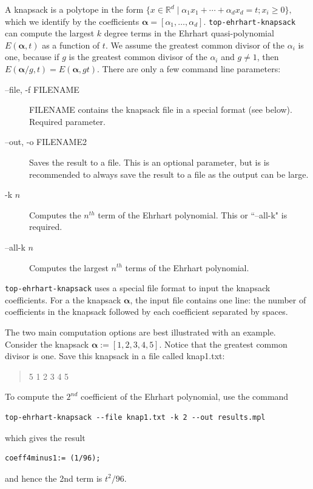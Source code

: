 \documentclass{article}
\newcommand{\R}{{\mathbb R}}
\begin{document}
A knapsack is a polytope in the form $\{x \in \R^d \mid \alpha_1 x_1 + \cdots + \alpha_d x_d = t; x_i \geq 0\},$ which we identify by the coefficients $\boldsymbol{\alpha}= [\alpha_1, \dots, \alpha_d].$   {\tt top-ehrhart-knapsack} can compute the largest $k$ degree terms in the Ehrhart quasi-polynomial $E(\boldsymbol{\alpha}, t)$ as a function of $t$.  We assume the greatest common divisor of the $\alpha_i$ is one, because if $g$ is the greatest common divisor of the $\alpha_i$ and $g\neq 1$, then $E(\boldsymbol{\alpha}/g, t) = E(\boldsymbol{\alpha}, gt) $. There are only a few command line parameters:

\begin{description}
\item[--file, -f FILENAME] FILENAME contains the knapsack file in a special format (see below). Required parameter.
\item[--out, -o FILENAME2] Saves the result to a file. This is an optional parameter, but is is recommended to always save the result to a file as the output can be large. 
\item[-k $n$] Computes the $n^{th}$ term of the Ehrhart polynomial. This or ``--all-k" is required.
\item[--all-k $n$] Computes the largest $n^{th}$ terms of the Ehrhart polynomial.  
\end{description}

{\tt top-ehrhart-knapsack} uses a special file format to input the knapsack coefficients. For a the knapsack $\boldsymbol{\alpha}$, the input file contains one line: the number of coefficients in the knapsack followed by each coefficient separated by spaces.

The two main computation options are best illustrated with an example. Consider the knapsack $\boldsymbol{\alpha}:=[1,2,3,4,5]$. Notice that the greatest common divisor  is one.  Save this knapsack in a file called knap1.txt:
\begin{verse}
5 1 2 3 4 5
\end{verse}

To compute the $2^{nd}$ coefficient of the Ehrhart polynomial,  use the command
\begin{verbatim}
top-ehrhart-knapsack --file knap1.txt -k 2 --out results.mpl
\end{verbatim}
which gives the result
\begin{verbatim}
coeff4minus1:= (1/96);
\end{verbatim}
and hence the 2nd term is $t^2/96$.
\end{document}

